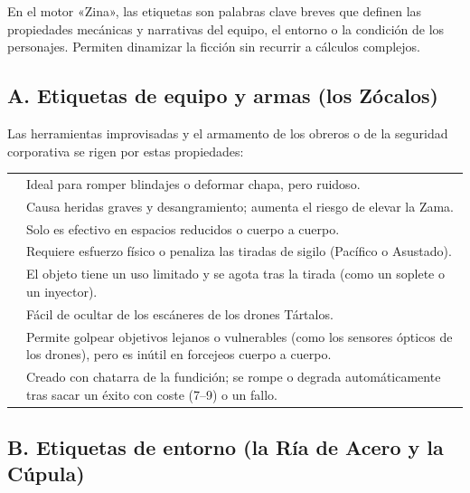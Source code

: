 En el motor «Zina», las etiquetas son palabras clave breves que definen las propiedades mecánicas y narrativas del equipo, el entorno o la condición de los personajes. Permiten dinamizar la ficción sin recurrir a cálculos complejos.

\newcommand{\tagtable}[1]{%
  \rowcolors{1}{white}{BoxGray}%
  \begin{tabularx}{\linewidth}{@{\hspace{3pt}}>{\raggedright\arraybackslash}p{.30\linewidth}>{\raggedright\arraybackslash}X@{}}
  #1
  \end{tabularx}\par\medskip}

\subsection{A. Etiquetas de equipo y armas (los Zócalos)}

Las herramientas improvisadas y el armamento de los obreros o de la seguridad corporativa se rigen por estas propiedades:

\tagtable{%
\etiqueta{Contundente} & Ideal para romper blindajes o deformar chapa, pero ruidoso. \\
\etiqueta{Desgarrador} & Causa heridas graves y desangramiento; aumenta el riesgo de elevar la Zama. \\
\etiqueta{A distancia corta} & Solo es efectivo en espacios reducidos o cuerpo a cuerpo. \\
\etiqueta{Pesado} & Requiere esfuerzo físico o penaliza las tiradas de sigilo (Pacífico o Asustado). \\
\etiqueta{Consumible} & El objeto tiene un uso limitado y se agota tras la tirada (como un soplete o un inyector). \\
\etiqueta{Clandestino} & Fácil de ocultar de los escáneres de los drones Tártalos. \\
\etiqueta{Preciso / A distancia} & Permite golpear objetivos lejanos o vulnerables (como los sensores ópticos de los drones), pero es inútil en forcejeos cuerpo a cuerpo. \\
\etiqueta{Improvisado} & Creado con chatarra de la fundición; se rompe o degrada automáticamente tras sacar un éxito con coste (7--9) o un fallo. \\}

\subsection{B. Etiquetas de entorno (la Ría de Acero y la Cúpula)}

